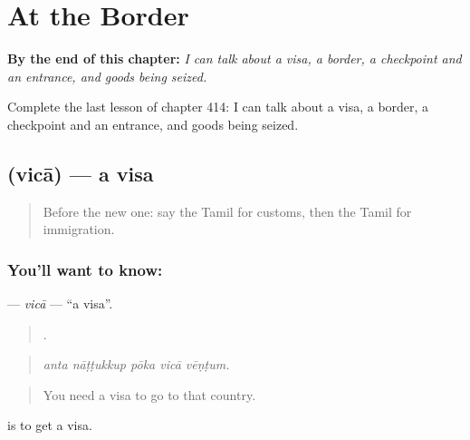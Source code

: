 
\chapter{At the Border}
\label{ch:ta-at-the-border}

\begin{chapteropening}
\textbf{By the end of this chapter:} \emph{I can talk about a visa, a border, a checkpoint and an entrance, and goods being seized.}

Complete the last lesson of chapter 414: I can talk about a visa, a border, a checkpoint and an entrance, and goods being seized.
\end{chapteropening}

\section[\texorpdfstring{\ta{விசா} (vicā)}{விசா (vicā)}]{ (vicā) — a visa}

\label{lesson:TA-C414-vica}



\begin{quote}
Before the new one: say the Tamil for customs, then the Tamil for immigration.
\end{quote}

\subsection*{You'll want to know: }
\textbf{} — \emph{vicā} — \textquotedblleft{}a visa\textquotedblright{}.

\begin{quote}
    .
\end{quote}

\begin{quote}
\emph{anta nāṭṭukkup pōka vicā vēṇṭum.}
\end{quote}

\begin{quote}
You need a visa to go to that country.
\end{quote}

  is to get a visa.


